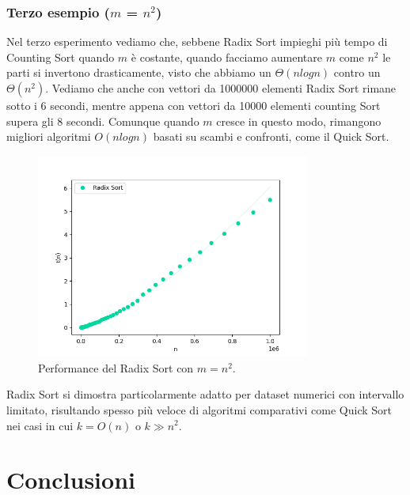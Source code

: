 \documentclass[a4paper, 12pt, oneside]{book}
\begin{document}
\subsection{Terzo esempio ($m$ = $n^2$)}

Nel terzo esperimento vediamo che, sebbene Radix Sort impieghi più tempo di Counting Sort quando \(m\) è costante, quando facciamo aumentare \(m\) come \(n^2\) le parti si invertono drasticamente, visto che abbiamo un \(\Theta(nlogn)\) contro un \(\Theta(n^2)\).
Vediamo che anche con vettori da 1000000 elementi Radix Sort rimane sotto i 6 secondi, mentre appena con vettori da 10000 elementi counting Sort supera gli 8 secondi. Comunque quando \(m\) cresce in questo modo, rimangono migliori algoritmi \(O(nlogn)\) basati su scambi e confronti, come il Quick Sort.

\begin{figure}[H]
    \centering
    \includegraphics[width=0.8\textwidth]{images/radixsort_nlogn.png}
    \caption{Performance del Radix Sort con \(m = n^2\).}
    \label{fig:radix_sort_3_way_m}
\end{figure}

\noindent Radix Sort si dimostra particolarmente adatto per dataset numerici con intervallo limitato, risultando spesso più veloce di algoritmi comparativi come Quick Sort nei casi in cui \(k = O(n)\) o \(k \gg n^2\).


\chapter{Conclusioni}\label{chap:Conclusioni} %
\end{document}
